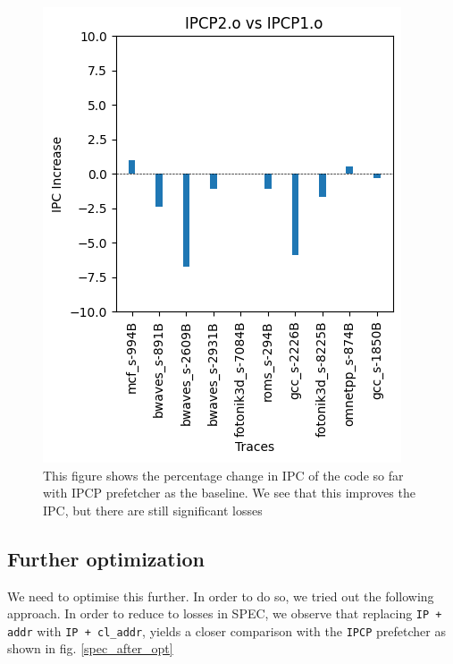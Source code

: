 \documentclass[conference]{IEEEtran}
\begin{document}
\begin{figure}
\includegraphics[scale=0.7]{Images/Bingo/incl_cplx.png}
\caption{This figure shows the percentage change in IPC of the code so far with IPCP prefetcher as the baseline. We see that this improves the IPC, but there are still significant losses}
\label{spec_after_opt_intermediate}
\end{figure}

\subsection{Further optimization}
We need to optimise this further. In order to do so, we tried out the following approach. In order to reduce to losses in SPEC, we observe that replacing \verb|IP + addr| with \verb|IP + cl_addr|, yields a closer comparison with the \verb|IPCP| prefetcher as shown in fig. \ref{spec_after_opt}
\end{document}
